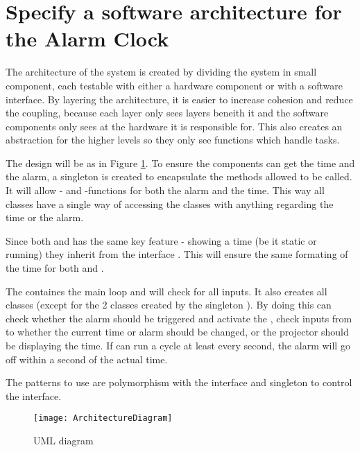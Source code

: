 \documentclass[Main_Assignment3]{subfiles}
\begin{document}
\section{Specify a software architecture for the Alarm Clock}

The architecture of the system is created by dividing the system in small component, each testable with either a hardware component or with a software interface.
By layering the architecture, it is easier to increase cohesion and reduce the coupling, because each layer only sees layers beneith it and the software components only sees at the hardware it is responsible for.
This also creates an abstraction for the higher levels so they only see functions which handle tasks.

The design will be as in Figure \ref{fig:UML}.
To ensure the components can get the time and the alarm, a singleton is created to encapsulate the methods allowed to be called. 
It will allow - and -functions for both the alarm and the time. This way all classes have a single way of accessing the classes with anything regarding the time or the alarm.

Since both  and  has the same key feature - showing a time (be it static or running) they inherit from the interface . 
This will ensure the same formating of the time for both  and .

The  containes the main loop and will check for all inputs.
It also creates all classes (except for the 2  classes created by the singleton ). 
By doing this  can check whether the alarm should be triggered and activate the , check inputs from  to whether the current time or alarm should be changed, or the projector should be displaying the time.
If  can run a cycle at least every second, the alarm will go off within a second of the actual time.

The patterns to use are polymorphism with the interface and singleton to control the interface.

\begin{figure}[hbtp]
\centering
\texttt{[image: ArchitectureDiagram]}
\caption{UML diagram}
\label{fig:UML}
\end{figure}
\end{document}
